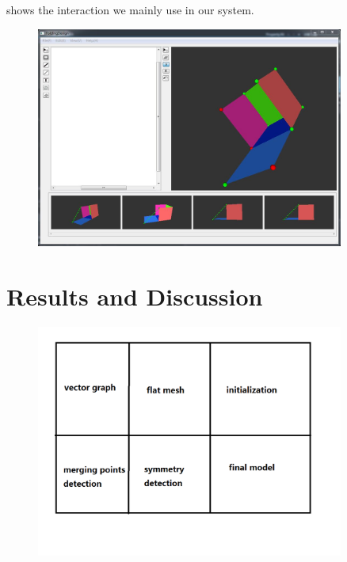 \documentclass[submission]{gmp2018}
\begin{document}
{ shows the interaction we mainly use in our system.}

\begin{figure}
	\centering
	\includegraphics[width=0.9\textwidth]{images/ui.jpg}
	\caption{}
	\label{fig:interface}
\end{figure}


\section{Results and Discussion}\label{sec:result}
{}


\begin{figure}
	\centering
	\includegraphics[width=0.9\textwidth]{images/result.png}
	\caption{}
	\label{fig:result}
\end{figure}
\end{document}
